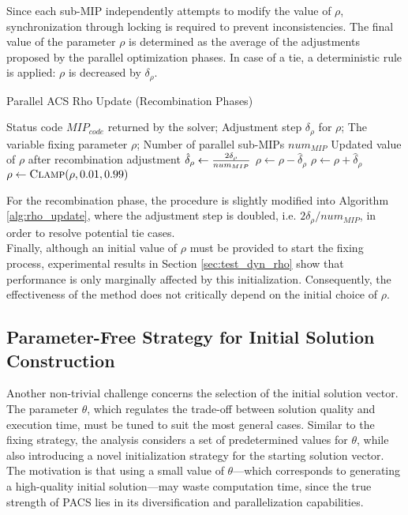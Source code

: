 Since each sub-MIP independently attempts to modify the value of $\rho$, synchronization through locking is required to prevent inconsistencies. The final value of the parameter $\rho$ is determined as the average of the adjustments proposed by the parallel optimization phases. In case of a tie, a deterministic rule is applied: $\rho$ is decreased by $\delta_\rho$.  
\begin{algorithm}[H]
\caption{Parallel ACS Rho Update (Recombination Phases)}\label{alg:rho_update}
\begin{algorithmic}[1]
\Require Status code $MIP_{code}$ returned by the solver; Adjustment step $\delta_\rho$ for $\rho$; The variable fixing parameter $\rho$; Number of parallel sub-MIPs $num_{MIP}$
\Ensure Updated value of $\rho$ after recombination adjustment
    \State $\hat\delta_\rho \gets {2\delta_\rho \over{num_{MIP}}}$
        \State $\rho \gets \rho - \hat\delta_\rho$
    \EndIf
        \State $\rho \gets \rho + \hat\delta_\rho$
    \EndIf
    \State $\rho \gets \Call{Clamp}{\rho,0.01,0.99}$
\EndFunction
\end{algorithmic}
\end{algorithm}
For the recombination phase, the procedure is slightly modified into Algorithm \ref{alg:rho_update}, where the adjustment step is doubled, i.e. $2\delta_\rho / num_{MIP}$, in order to resolve potential tie cases.\\
Finally, although an initial value of $\rho$ must be provided to start the fixing process, experimental results in Section \ref{sec:test_dyn_rho} show that performance is only marginally affected by this initialization. Consequently, the effectiveness of the method does not critically depend on the initial choice of $\rho$.

\subsection{Parameter-Free Strategy for Initial Solution Construction}\label{sec:init_sol_maxFeas}
Another non-trivial challenge concerns the selection of the initial solution vector. The parameter $\theta$, which regulates the trade-off between solution quality and execution time, must be tuned to suit the most general cases. Similar to the fixing strategy, the analysis considers a set of predetermined values for $\theta$, while also introducing a novel initialization strategy for the starting solution vector.  
The motivation is that using a small value of $\theta$---which corresponds to generating a high-quality initial solution---may waste computation time, since the true strength of PACS lies in its diversification and parallelization capabilities.  

